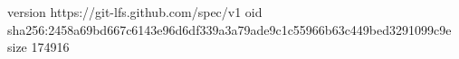 version https://git-lfs.github.com/spec/v1
oid sha256:2458a69bd667c6143e96d6df339a3a79ade9c1c55966b63c449bed3291099c9e
size 174916
